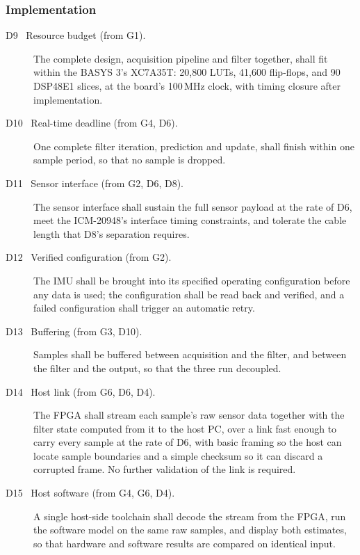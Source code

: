 \documentclass[12pt,a4paper]{article}
\begin{document}
\subsubsection{Implementation}

\begin{description}
  \item[D9 \ Resource budget (from G1).] The complete design,
        acquisition pipeline and filter together, shall fit within
        the BASYS 3's XC7A35T: 20{,}800 LUTs, 41{,}600 flip-flops, and 90
        DSP48E1 slices, at the board's 100\,MHz clock, with timing
        closure after implementation.
  \item[D10 \ Real-time deadline (from G4, D6).] One complete filter
        iteration, prediction and update, shall finish within one
        sample period, so that no sample is dropped.
  \item[D11 \ Sensor interface (from G2, D6, D8).] The sensor
        interface shall sustain the full sensor payload at the rate
        of D6, meet the ICM-20948's interface timing constraints,
        and tolerate the cable length that D8's separation
        requires.
  \item[D12 \ Verified configuration (from G2).] The IMU shall be
        brought into its specified operating configuration before
        any data is used; the configuration shall be read back and
        verified, and a failed configuration shall trigger an
        automatic retry.
  \item[D13 \ Buffering (from G3, D10).] Samples shall be buffered
        between acquisition and the filter, and between the filter
        and the output, so that the three run decoupled.

  \item[D14 \ Host link (from G6, D6, D4).] The FPGA shall stream
        each sample's raw sensor data together with the filter state
        computed from it to the host PC, over a link fast enough to
        carry every sample at the rate of D6, with basic framing so
        the host can locate sample boundaries and a simple checksum
        so it can discard a corrupted frame. No further validation of
        the link is required.
        
  \item[D15 \ Host software (from G4, G6, D4).] A single host-side
        toolchain shall decode the stream from the FPGA, run the
        software model on the same raw samples, and display both
        estimates, so that hardware and software results are compared
        on identical input.
\end{description}
\newpage
\end{document}
